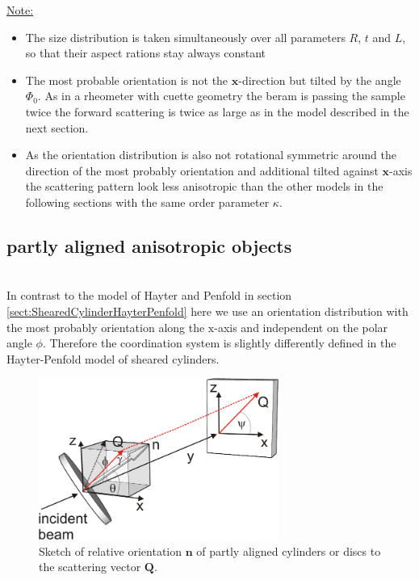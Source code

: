 \underline{Note:}
\begin{itemize}
\item The size distribution is taken simultaneously over all parameters $R$, $t$ and $L$, so that their aspect rations stay always constant
\item The most probable orientation is not the $\mathbf{x}$-direction but tilted by the angle $\varPhi_0$. As in a rheometer with cuette geometry the beram is passing the sample twice the forward scattering is twice as large as in the model described in the next section.
\item As the orientation distribution is also not rotational symmetric around the direction of the most probably orientation and additional tilted against $\mathbf{x}$-axis the scattering pattern look less anisotropic than the other models in the following sections with the same order parameter $\kappa$.
\end{itemize}

\newpage
\subsection{partly aligned anisotropic objects}
\label{sect:partlyalignedCylShell}
~\\

In contrast to the model of Hayter and Penfold \cite{Hayter1984} in section \ref{sect:ShearedCylinderHayterPenfold} here we use an orientation distribution with the most probably orientation along the $\mathrm{x}$-axis and independent on the polar angle $\phi$.
Therefore the coordination system is slightly differently defined in the Hayter-Penfold model of sheared cylinders.
\begin{figure}[htb]
\begin{center}
\includegraphics[width=0.7\textwidth]{../images/form_factor/cylindrical_obj/partly_aligned_discs.png}
\end{center}
\caption{Sketch of relative orientation $\mathbf{n}$ of partly
aligned cylinders or discs to the scattering vector $\mathbf{Q}$.}
\label{fig:partly_aligned_discs}
\end{figure}

